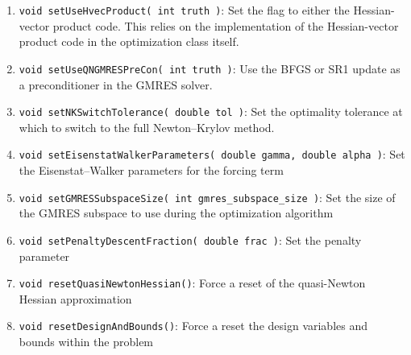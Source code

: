 \documentclass[12pt]{article}
\begin{document}
\begin{enumerate}
\item \texttt{void setUseHvecProduct( int truth )}: Set the flag to either the Hessian-vector product code. This relies on the implementation of the Hessian-vector product code in the optimization class itself.

\item \texttt{void setUseQNGMRESPreCon( int truth )}: Use the BFGS or SR1 update as a preconditioner in the GMRES solver.

\item \texttt{void setNKSwitchTolerance( double tol )}: Set the optimality tolerance at which to switch to the full Newton--Krylov method.

\item \texttt{void setEisenstatWalkerParameters( double gamma, double alpha )}: Set the Eisenstat--Walker parameters for the forcing term

\item \texttt{void setGMRESSubspaceSize( int gmres\_subspace\_size )}: Set the size of the GMRES subspace to use during the optimization algorithm

\item \texttt{void setPenaltyDescentFraction( double frac )}: Set the penalty parameter 

\item \texttt{void resetQuasiNewtonHessian()}: Force a reset of the quasi-Newton Hessian approximation

\item \texttt{void resetDesignAndBounds()}: Force a reset the design variables and bounds within the problem
\end{enumerate}



\end{document}
